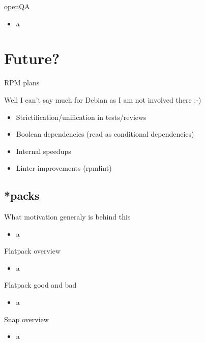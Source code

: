 \documentclass{beamer}
\begin{document}
\begin{frame}[t]{openQA}
	\begin{itemize}
	\item a
	\end{itemize}
\end{frame}

\section{Future?}

\begin{frame}[t]{RPM plans}
    \begin{center}Well I can't say much for Debian as I am not involved there :-)\end{center}
	\begin{itemize}
	\item Strictification/unification in tests/reviews
	\item Boolean dependencies (read as conditional dependencies)
	\item Internal speedups
	\item Linter improvements (rpmlint)
	\end{itemize}
\end{frame}

\subsection{*packs}

\begin{frame}[t]{What motivation generaly is behind this}
	\begin{itemize}
	\item a
	\end{itemize}
\end{frame}

\begin{frame}[t]{Flatpack overview}
	\begin{itemize}
	\item a
	\end{itemize}
\end{frame}

\begin{frame}[t]{Flatpack good and bad}
	\begin{itemize}
	\item a
	\end{itemize}
\end{frame}

\begin{frame}[t]{Snap overview}
	\begin{itemize}
	\item a
	\end{itemize}
\end{frame}
\end{document}
